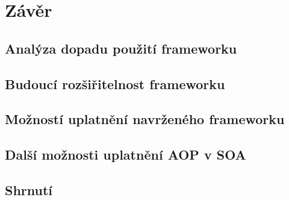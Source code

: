 \usepackage[T1]{fontenc}
\usepackage[utf8]{inputenc}


\chapter{Závěr}\label{ch:zaver}

\section{Analýza dopadu použití frameworku}

\section{Budoucí rozšiřitelnost frameworku}

\section{Možností uplatnění navrženého frameworku}

\section{Další možnosti uplatnění \gls{AOP} v \gls{SOA}}


\section{Shrnutí}


